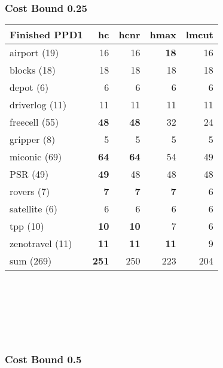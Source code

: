     \subsubsection*{Cost Bound 0.25}
    \begin{center}
        \begin{tabular}{l|r|r|r|r}
            Finished PPD1 & hc & hcnr & hmax & lmcut \\\hline
            airport (19) & 16 & 16 & \textbf{18} & 16\\\hline
            blocks (18) & 18 & 18 & 18 & 18 \\\hline
            depot (6) & 6 & 6 & 6 & 6 \\\hline
            driverlog (11) & 11 & 11 & 11 & 11 \\\hline
            freecell (55) & \textbf{48} & \textbf{48} & 32 & 24 \\\hline
            gripper (8) & 5 & 5 & 5 & 5 \\\hline
            miconic (69) & \textbf{64} & \textbf{64} & 54 & 49 \\\hline
            PSR (49) & \textbf{49} & 48 & 48 & 48 \\\hline
            rovers (7) & \textbf{7} & \textbf{7} & \textbf{7} & 6 \\\hline
            satellite (6) & 6 & 6 & 6 & 6 \\\hline
            tpp (10) & \textbf{10} & \textbf{10} & 7 & 6 \\\hline
            zenotravel (11) & \textbf{11} & \textbf{11} & \textbf{11} & 9 \\\hline\hline
            sum (269) & \textbf{251} & 250 & 223 & 204 \\\hline
        \end{tabular}

        \scriptsize
        \\
        \\
        \\
        \\
        \\
        
    \end{center}
   

    \subsubsection*{Cost Bound 0.5}

